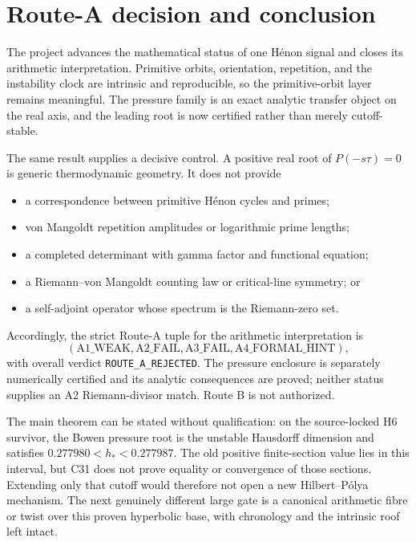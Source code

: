 \section{Route-A decision and conclusion}
\label{sec:routea}

The project advances the mathematical status of one H\'enon signal and closes
its arithmetic interpretation.  Primitive orbits, orientation, repetition,
and the instability clock are intrinsic and reproducible, so the
primitive-orbit layer remains meaningful.  The pressure family is an exact
analytic transfer object on the real axis, and the leading root is now
certified rather than merely cutoff-stable.

The same result supplies a decisive control.  A positive real root of
\(P(-s\tau)=0\) is generic thermodynamic geometry.  It does not provide

\begin{itemize}[leftmargin=2em]
  \item a correspondence between primitive H\'enon cycles and primes;
  \item von Mangoldt repetition amplitudes or logarithmic prime lengths;
  \item a completed determinant with gamma factor and functional equation;
  \item a Riemann--von Mangoldt counting law or critical-line symmetry; or
  \item a self-adjoint operator whose spectrum is the Riemann-zero set.
\end{itemize}

Accordingly, the strict Route-A tuple for the arithmetic interpretation is
\[
 (\mathrm{A1\_WEAK},\mathrm{A2\_FAIL},
   \mathrm{A3\_FAIL},\mathrm{A4\_FORMAL\_HINT}),
\]
with overall verdict \texttt{ROUTE\_A\_REJECTED}.  The pressure enclosure is
separately numerically certified and its analytic consequences are proved;
neither status supplies an A2 Riemann-divisor match.  Route B is not
authorized.

The main theorem can be stated without qualification: on the source-locked
H6 survivor, the Bowen pressure root is the unstable Hausdorff dimension and
satisfies \(0.277980<h_*<0.277987\).  The old positive finite-section value
lies in this interval, but C31 does not prove equality or convergence of those
sections.  Extending only that cutoff would therefore not open a new
Hilbert--P\'olya mechanism.  The next genuinely different large gate is a
canonical arithmetic fibre or twist over this proven hyperbolic base, with
chronology and the intrinsic roof left intact.
